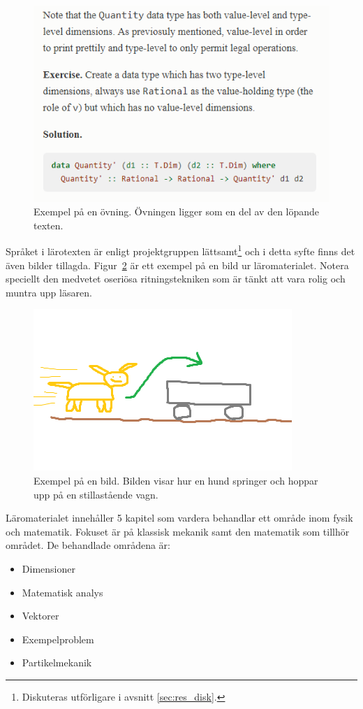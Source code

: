 \begin{figure}[tph]
    \centering
    \includegraphics[width=0.4\linewidth]{figure/smakprov_ovning.png}
    \caption{Exempel på en övning. Övningen ligger som en del av den löpande texten.}
    \label{fig:smakprov_ovning}
\end{figure}

Språket i lärotexten är enligt projektgruppen lättsamt\footnote{Diskuteras utförligare i avsnitt \ref{sec:res_disk}.} och i detta syfte finns det även bilder tillagda. Figur~\ref{fig:smakprov_bild_laromaterial} är ett exempel på en bild ur
läromaterialet. Notera speciellt den medvetet oseriösa ritningstekniken som är tänkt att vara rolig och muntra upp läsaren.

\begin{figure}[tph]
        \centering
        \includegraphics[width=0.4\linewidth]{figure/smakprov_bild_laromaterial.png}
        \caption{Exempel på en bild. Bilden visar hur en hund springer och hoppar upp på en stillastående vagn.}
        \label{fig:smakprov_bild_laromaterial}
\end{figure}

Läromaterialet innehåller 5 kapitel som vardera behandlar ett område inom fysik och matematik. Fokuset är på klassisk mekanik samt den matematik som tillhör området. De behandlade områdena är:

\begin{itemize}
  \item Dimensioner
  \item Matematisk analys
  \item Vektorer
  \item Exempelproblem
  \item Partikelmekanik
\end{itemize}

